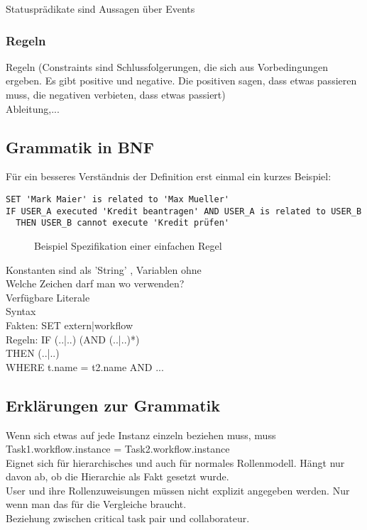 Statusprädikate sind Aussagen über Events

\subsubsection{Regeln}
Regeln (Constraints sind Schlussfolgerungen, die sich aus Vorbedingungen ergeben. Es gibt positive und negative. Die positiven sagen, dass etwas passieren muss, die negativen verbieten, dass etwas passiert)\\
Ableitung,...\\

\subsection{Grammatik in BNF}
Für ein besseres Verständnis der Definition erst einmal ein kurzes Beispiel:\\

\begin{verbatim}
SET 'Mark Maier' is related to 'Max Mueller'
IF USER_A executed 'Kredit beantragen' AND USER_A is related to USER_B
  THEN USER_B cannot execute 'Kredit prüfen'
\end{verbatim}
\begin{figure}[!h]
\caption{Beispiel Spezifikation einer einfachen Regel}
\label{fig:demorulefile}
\end{figure}

Konstanten sind als 'String' , Variablen ohne \\
Welche Zeichen darf man wo verwenden?\\
Verfügbare Literale\\
Syntax\\
Fakten: SET extern|workflow \\
Regeln: 	IF (..|..) (AND (..|..)*) \\
THEN (..|..) \\
WHERE t.name = t2.name AND  ...\\
\subsection{Erklärungen zur Grammatik}
Wenn sich etwas auf jede Instanz einzeln beziehen muss, muss Task1.workflow.instance = Task2.workflow.instance\\
Eignet sich für hierarchisches und auch für normales Rollenmodell. Hängt nur davon ab, ob die Hierarchie als Fakt gesetzt wurde.\\
User und ihre Rollenzuweisungen müssen nicht explizit angegeben werden. Nur wenn man das für die Vergleiche braucht.\\
Beziehung zwischen critical task pair und collaborateur.

